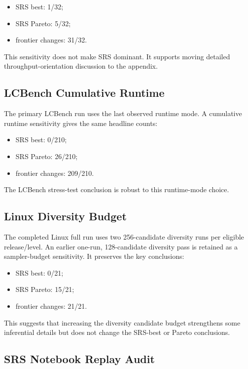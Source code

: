 \documentclass[smallcondensed]{svjour3}
\providecommand{\tightlist}{%
  \setlength{\itemsep}{0pt}\setlength{\parskip}{0pt}}
\begin{document}
\begin{itemize}
\tightlist
\item
  SRS best: 1/32;
\item
  SRS Pareto: 5/32;
\item
  frontier changes: 31/32.
\end{itemize}

This sensitivity does not make SRS dominant. It supports moving detailed
throughput-orientation discussion to the appendix.

\subsection{LCBench Cumulative
Runtime}\label{lcbench-cumulative-runtime}

The primary LCBench run uses the last observed runtime mode. A
cumulative runtime sensitivity gives the same headline counts:

\begin{itemize}
\tightlist
\item
  SRS best: 0/210;
\item
  SRS Pareto: 26/210;
\item
  frontier changes: 209/210.
\end{itemize}

The LCBench stress-test conclusion is robust to this runtime-mode
choice.

\subsection{Linux Diversity Budget}\label{linux-diversity-budget}

The completed Linux full run uses two 256-candidate diversity runs per
eligible release/level. An earlier one-run, 128-candidate diversity pass
is retained as a sampler-budget sensitivity. It preserves the key
conclusions:

\begin{itemize}
\tightlist
\item
  SRS best: 0/21;
\item
  SRS Pareto: 15/21;
\item
  frontier changes: 21/21.
\end{itemize}

This suggests that increasing the diversity candidate budget strengthens
some inferential details but does not change the SRS-best or Pareto
conclusions.

\subsection{SRS Notebook Replay Audit}\label{srs-notebook-replay-audit}
\end{document}
